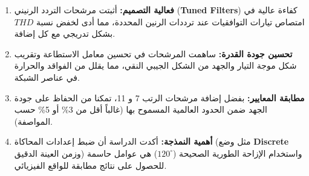 \documentclass[12pt, a4paper, twoside]{article} %
\newcommand{\el}{\textenglish} %
\begin{document}
\begin{enumerate}
    \item \textbf{فعالية التصميم:} أثبتت مرشحات التردد الرنيني \el{(\textbf{Tuned Filters})} كفاءة عالية في امتصاص تيارات التوافقيات عند ترددات الرنين المحددة، مما أدى لخفض نسبة \el{$THD$} بشكل تدريجي مع كل إضافة.
    \item \textbf{تحسين جودة القدرة:} ساهمت المرشحات في تحسين معامل الاستطاعة وتقريب شكل موجة التيار والجهد من الشكل الجيبي النقي، مما يقلل من الفواقد والحرارة في عناصر الشبكة.
    \item \textbf{مطابقة المعايير:} بفضل إضافة مرشحات الرتب 7 و 11، تمكنا من الحفاظ على جودة الجهد ضمن الحدود العالمية المسموح بها (غالباً أقل من 3\% أو 5\% حسب المواصفة).
    \item \textbf{أهمية النمذجة:} أكدت الدراسة أن ضبط إعدادات المحاكاة (مثل وضع \el{\textbf{Discrete}} وزمن العينة الدقيق) واستخدام الإزاحة الطورية الصحيحة ($120^\circ$) هي عوامل حاسمة للحصول على نتائج مطابقة للواقع الفيزيائي.
\end{enumerate}
\end{document}
